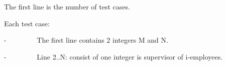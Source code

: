 The first line is the number of test cases.  

   Each test case:  

   -         The first line contains 2 integers M and N.  

   -         Line 2..N: consist of one integer is supervisor of i-employees.  

\